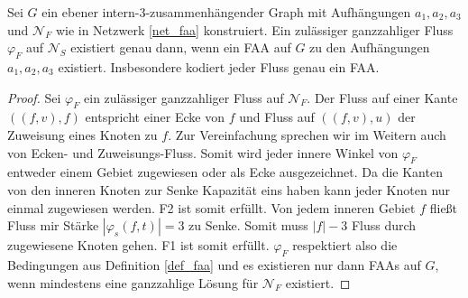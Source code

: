 \begin{proposition}\label{prop_net_faa}
Sei $G$ ein ebener intern-3-zusammenhängender Graph mit Aufhängungen $a_1,a_2,a_3$ und $\mathcal{N}_F$ wie in Netzwerk \ref{net_faa} konstruiert. Ein zulässiger ganzzahliger Fluss $\varphi_F$ auf $\mathcal{N}_S$ existiert genau dann, wenn ein FAA auf $G$ zu den Aufhängungen $a_1,a_2,a_3$ existiert. Insbesondere kodiert jeder Fluss genau ein FAA.
\end{proposition}

\begin{proof}
Sei $\varphi_F$ ein zulässiger ganzzahliger Fluss auf $\mathcal{N}_F$. Der Fluss auf einer Kante $((f,v),f)$ entspricht einer Ecke von $f$ und Fluss auf $((f,v),u)$ der Zuweisung eines Knoten zu $f$. Zur Vereinfachung sprechen wir im Weitern auch von Ecken- und Zuweisungs-Fluss. Somit wird jeder innere Winkel von $\varphi_F$ entweder einem Gebiet zugewiesen oder als Ecke ausgezeichnet. Da die Kanten von den inneren Knoten zur Senke Kapazität eins haben kann jeder Knoten nur einmal zugewiesen werden. F2 ist somit erfüllt. Von jedem inneren Gebiet $f$ fließt Fluss mir Stärke $|\varphi_s(f,t)| = 3$ zu Senke. Somit muss $|f|-3$ Fluss durch zugewiesene Knoten gehen. F1 ist somit erfüllt. $\varphi_F$ respektiert also die Bedingungen aus Definition \ref{def_faa} und es existieren nur dann FAAs auf $G$, wenn mindestens eine ganzzahlige Lösung für $\mathcal{N}_F$ existiert.
\end{proof}


